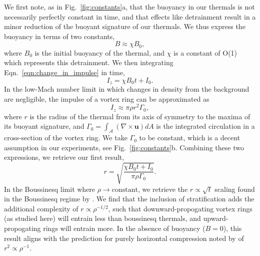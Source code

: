 \documentclass[twocolumn, amsmath, amsfonts, amssymb, trackchanges]{aastex62}
\newcommand{\grad}{\ensuremath{\nabla}}
\begin{document}
We first note, as in Fig.~\ref{fig:constants}a, that the buoyancy in our thermals
is not necessarily perfectly constant in time, and that effects like detrainment result
in a minor reduction of the buoyant signature of our thermals. We thus express the
buoyancy in terms of two constants,
\begin{equation}
B \approx \chi B_0,
\end{equation}
where $B_0$ is the initial buoyancy of the thermal, and $\chi$ is a constant of
O(1) which represents this detrainment. We then integrating 
Eqn.~\ref{eqn:change_in_impulse} in time,
\begin{equation*}
I_z = \chi B_0 t + I_0.
\end{equation*}
In the low-Mach number limit in which changes in density from the background are negligible,
the impulse of a vortex ring can be approximated as
\begin{equation*}
I_z \approx \pi \rho r^2 \Gamma_0,
\end{equation*}
where $r$ is the radius of the thermal from its axis
of symmetry to the maxima of its buoyant signature, and
$\Gamma_0 = \int_{\mathcal{A}} (\grad\times\bm{u})dA$ is the integrated circulation
in a cross-section of the vortex ring. We take $\Gamma_0$ to be constant, which is
a decent assumption in our experiments, see Fig.~\ref{fig:constants}b.
Combining these two expressions, we retrieve our first result,
\begin{equation}
r = \sqrt{\frac{\chi B_0 t + I_0}{\pi\rho\Gamma_0}}.
\label{eqn:r_theory}
\end{equation}
In the Boussinesq limit where $\rho \rightarrow \text{constant}$, 
we retrieve the $r \propto \sqrt{t}$ scaling found in the Boussinesq regime by
\citet{lecoanet&jeevanjee2018}. We find that the inclusion of stratification adds the
additional complexity of $r \propto \rho^{-1/2}$, such that downward-propogating 
vortex rings (as studied here) will entrain less than boussinesq thermals,
and upward-propogating rings will entrain more. In the absence of buoyancy ($B = 0$),
this result aligns with the prediction for purely horizontal compression noted by
\citet{brandenburg2016} of $r^2 \propto \rho^{-1}$.
\end{document}
